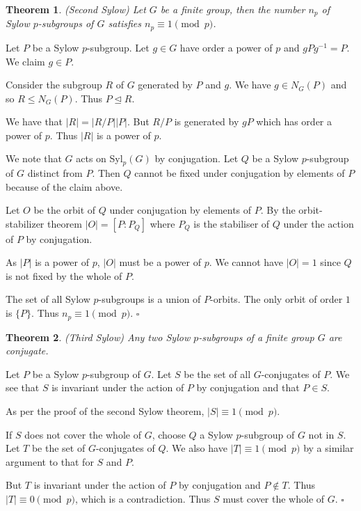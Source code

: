 \documentclass[10pt]{article}
\newtheorem{theorem}{Theorem}[section]
\newenvironment{proof}[1][Proof]{\begin{trivlist}
\item[\hskip \labelsep {\itshape #1}]}{\end{trivlist}}
\begin{document}
\begin{theorem} (Second Sylow)
Let $G$ be a finite group, then the number $n_p$ of Sylow $p$-subgroups of $G$ satisfies $n_p \equiv 1 \pmod{p}$.
\end{theorem}

\begin{proof}
Let $P$ be a Sylow $p$-subgroup. Let $g \in G$ have order a power of $p$ and $gPg^{-1} = P$. We claim $g \in P$. 

Consider the subgroup $R$ of $G$ generated by $P$ and $g$. We have $g \in N_G(P)$ and so $R \leq N_G(P)$. Thus $P \mathrel{\unlhd} R$.

We have that $|R| = |R/P||P|$. But $R/P$ is generated by $gP$ which has order a power of $p$. Thus $|R|$ is a power of $p$.

We note that $G$ acts on Syl$_p(G)$ by conjugation. Let $Q$ be a Sylow $p$-subgroup of $G$ distinct from $P$. Then $Q$ cannot be fixed under conjugation by elements of $P$ because of the claim above.

Let $O$ be the orbit of $Q$ under conjugation by elements of $P$. By the orbit-stabilizer theorem $|O| = [P:P_Q]$ where $P_Q$ is the stabiliser of $Q$ under the action of $P$ by conjugation.

As $|P|$ is a power of $p$, $|O|$ must be a power of $p$. We cannot have $|O| = 1$ since $Q$ is not fixed by the whole of $P$.

The set of all Sylow $p$-subgroups is a union of $P$-orbits. The only orbit of order $1$ is $\{P\}$. Thus $n_p \equiv 1 \pmod{p}$. $\square$
\end{proof}

\begin{theorem} (Third Sylow)
Any two Sylow $p$-subgroups of a finite group $G$ are conjugate.
\end{theorem}

\begin{proof}
Let $P$ be a Sylow $p$-subgroup of $G$. Let $S$ be the set of all $G$-conjugates of $P$. We see that $S$ is invariant under the action of $P$ by conjugation and that $P \in S$.

As per the proof of the second Sylow theorem, $|S| \equiv 1 \pmod{p}$.

If $S$ does not cover the whole of $G$, choose $Q$ a Sylow $p$-subgroup of $G$ not in $S$. Let $T$ be the set of $G$-conjugates of $Q$. We also have $|T| \equiv 1 \pmod{p}$ by a similar argument to that for $S$ and $P$.

But $T$ is invariant under the action of $P$ by conjugation and $P \notin T$. Thus $|T| \equiv 0 \pmod{p}$, which is a contradiction. Thus $S$ must cover the whole of $G$. $\square$
\end{proof}
\end{document}
